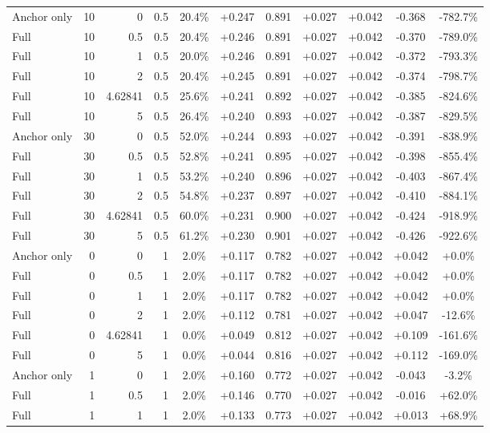 \begin{table}[htbp]
\begin{tabular}{lrrrccccccc}
Anchor only & 10 & 0 & 0.5 & 20.4\% & +0.247 & 0.891 & +0.027 & +0.042 & -0.368 & -782.7\% \\
Full & 10 & 0.5 & 0.5 & 20.4\% & +0.246 & 0.891 & +0.027 & +0.042 & -0.370 & -789.0\% \\
Full & 10 & 1 & 0.5 & 20.0\% & +0.246 & 0.891 & +0.027 & +0.042 & -0.372 & -793.3\% \\
Full & 10 & 2 & 0.5 & 20.4\% & +0.245 & 0.891 & +0.027 & +0.042 & -0.374 & -798.7\% \\
Full & 10 & 4.62841 & 0.5 & 25.6\% & +0.241 & 0.892 & +0.027 & +0.042 & -0.385 & -824.6\% \\
Full & 10 & 5 & 0.5 & 26.4\% & +0.240 & 0.893 & +0.027 & +0.042 & -0.387 & -829.5\% \\
Anchor only & 30 & 0 & 0.5 & 52.0\% & +0.244 & 0.893 & +0.027 & +0.042 & -0.391 & -838.9\% \\
Full & 30 & 0.5 & 0.5 & 52.8\% & +0.241 & 0.895 & +0.027 & +0.042 & -0.398 & -855.4\% \\
Full & 30 & 1 & 0.5 & 53.2\% & +0.240 & 0.896 & +0.027 & +0.042 & -0.403 & -867.4\% \\
Full & 30 & 2 & 0.5 & 54.8\% & +0.237 & 0.897 & +0.027 & +0.042 & -0.410 & -884.1\% \\
Full & 30 & 4.62841 & 0.5 & 60.0\% & +0.231 & 0.900 & +0.027 & +0.042 & -0.424 & -918.9\% \\
Full & 30 & 5 & 0.5 & 61.2\% & +0.230 & 0.901 & +0.027 & +0.042 & -0.426 & -922.6\% \\
Anchor only & 0 & 0 & 1 & 2.0\% & +0.117 & 0.782 & +0.027 & +0.042 & +0.042 & +0.0\% \\
Full & 0 & 0.5 & 1 & 2.0\% & +0.117 & 0.782 & +0.027 & +0.042 & +0.042 & +0.0\% \\
Full & 0 & 1 & 1 & 2.0\% & +0.117 & 0.782 & +0.027 & +0.042 & +0.042 & +0.0\% \\
Full & 0 & 2 & 1 & 2.0\% & +0.112 & 0.781 & +0.027 & +0.042 & +0.047 & -12.6\% \\
Full & 0 & 4.62841 & 1 & 0.0\% & +0.049 & 0.812 & +0.027 & +0.042 & +0.109 & -161.6\% \\
Full & 0 & 5 & 1 & 0.0\% & +0.044 & 0.816 & +0.027 & +0.042 & +0.112 & -169.0\% \\
Anchor only & 1 & 0 & 1 & 2.0\% & +0.160 & 0.772 & +0.027 & +0.042 & -0.043 & -3.2\% \\
Full & 1 & 0.5 & 1 & 2.0\% & +0.146 & 0.770 & +0.027 & +0.042 & -0.016 & +62.0\% \\
Full & 1 & 1 & 1 & 2.0\% & +0.133 & 0.773 & +0.027 & +0.042 & +0.013 & +68.9\% \\

\end{tabular}
\end{table}
